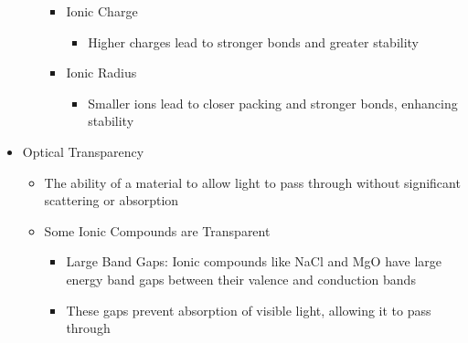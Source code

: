 \begin{itemize}
\begin{itemize}
\begin{itemize}
          \item Ionic Charge

            \begin{itemize}

              \item Higher charges lead to stronger bonds and greater stability

            \end{itemize}

          \item Ionic Radius

            \begin{itemize}

              \item Smaller ions lead to closer packing and stronger bonds, enhancing stability

            \end{itemize}

        \end{itemize}

    \end{itemize}

  \item Optical Transparency

    \begin{itemize}

      \item The ability of a material to allow light to pass through without significant scattering or absorption

      \item Some Ionic Compounds are Transparent

        \begin{itemize}

          \item Large Band Gaps: Ionic compounds like NaCl and MgO have large energy band gaps between their valence and conduction bands

          \item These gaps prevent absorption of visible light, allowing it to pass through

        \end{itemize}

    \end{itemize}

\end{itemize}



